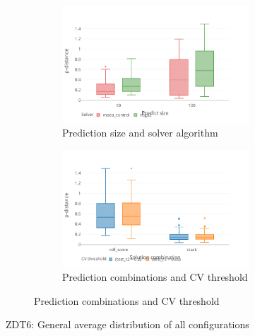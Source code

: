     \begin{figure}
        \centering

        \begin{subfigure}{\textwidth}
            \begin{subfigure}{0.5\textwidth}
                \includegraphics[width=\textwidth]{content/images/conf_zdt6_pred_solver}
                \caption{Prediction size and solver algorithm}
                \label{fig:zdt6_pred_solver}
            \end{subfigure} 
            \begin{subfigure}{0.5\textwidth}
                \includegraphics[width=\textwidth]{content/images/conf_zdt6_comb_valid}
                \caption{Prediction combinations and CV threshold}
                \label{fig:zdt6_comb_valid}
            \end{subfigure}
        \end{subfigure} 

        \caption[ZDT6: General average distribution of all configurations]{ZDT6: General average distribution of all configurations}
        \label{fig:conf_zdt6}    
    \end{figure}


